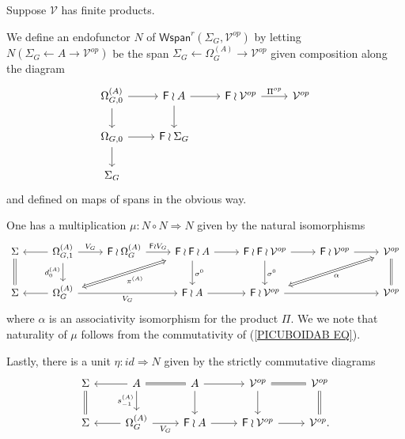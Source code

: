 \documentclass[a4paper,10pt]{article}%
\begin{document}
\begin{definition}
	Suppose $\mathcal{V}$ has finite products.
	
	We define an endofunctor $N$ of 
	$\mathsf{Wspan}^r(\Sigma_G,\mathcal{V}^{op})$
	by letting $N(\Sigma_G \leftarrow A \to \mathcal{V}^{op})$
	be the span $\Sigma_G \leftarrow \Omega^{(A)}_G \to \mathcal{V}^{op}$ given composition along the diagram
\[
	\begin{tikzcd}
	\Omega^{(A)}_{G,0} \ar{r} \ar{d}&
	\Fin \wr A \ar{r} \ar{d}&
	\Fin \wr \mathcal{V}^{op} \ar{r}{\Pi^{op}} &
	\mathcal{V}^{op}
\\
	\Omega_{G,0} \ar{r} \ar{d} &
	\Fin \wr \Sigma_G
\\
	\Sigma_G
	\end{tikzcd}
\]
and defined on maps of spans in the obvious way.

One has a multiplication $\mu \colon N \circ N \Rightarrow N$ given by the natural isomorphisms
\begin{equation}\label{MULTDEFSPAN EQ}
	\begin{tikzcd}
	\Sigma \ar[equal]{d}&
	\Omega_{G,1}^{(A)} \ar{r}{V_G} \ar{d}[swap]{d_{0}^{(A)}} \ar{l}&
	\Fin \wr \Omega_{G}^{(A)} \ar{r}{\Fin \wr V_G} &
	|[alias=FFOmega]|\Fin \wr \Fin \wr A \ar{d}{\sigma^0} \ar{r} &
	\Fin \wr \Fin \wr \mathcal{V}^{op} \ar{d}{\sigma^0} \ar{r} &
	\Fin \wr \mathcal{V}^{op} \ar{r} &
	|[alias=dog]|
	\mathcal{V}^{op} \ar[equal]{d}
\\
	\Sigma &
	|[alias=Omega]|\Omega_{G}^{(A)} \ar{rr}[swap]{V_G} \ar{l}&&
	\Fin \wr A \ar{r} &
	|[alias=cat]|
	\Fin \wr \mathcal{V}^{op} \ar{rr} &&
	\mathcal{V}^{op}
	\arrow[Leftrightarrow, from=FFOmega, to=Omega,shorten <=0.15cm,,shorten >=0.15cm,"\pi^{(A)}"]
	\arrow[Leftrightarrow, from=dog, to=cat,shorten <=0.15cm,,shorten >=0.15cm,"\alpha"]
	\end{tikzcd}
\end{equation}
where $\alpha$ is an associativity isomorphism for the product $\Pi$. We we note that naturality of $\mu$ 
follows from the commutativity of (\ref{PICUBOIDAB EQ}).

Lastly, there is a unit $\eta \colon id \Rightarrow N$ given by the strictly commutative diagrams
\begin{equation}\label{UNITSPAN EQ}
	\begin{tikzcd}
	\Sigma \ar[equal]{d} &
	A \ar{l} \ar{d}[swap]{s_{-1}^{(A)}} \ar[equal]{r} &
	A \ar{d} \ar{r} &
	\mathcal{V}^{op} \ar{d} \ar[equal]{r}&
	\mathcal{V}^{op} \ar[equal]{d}
\\
	\Sigma &
	\Omega_G^{(A)} \ar{l} \ar{r}[swap]{V_G}&
	\Fin \wr A \ar{r} &
	\Fin \wr \mathcal{V}^{op} \ar{r} &
	\mathcal{V}^{op}.
	\end{tikzcd}
\end{equation}	
\end{definition}
\end{document}
